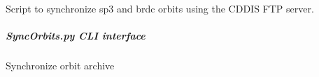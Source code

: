 \documentclass[letterpaper,10pt,english]{sphinxmanual}
\begin{document}
\sphinxAtStartPar
Script to synchronize sp3 and brdc orbits using the CDDIS FTP server.

\begin{fulllineitems}
\label{\detokenize{pgamit.com:pgamit.com.SyncOrbits.main}}
\pysigstartsignatures
\pysiglinewithargsret
{}
{}
{}
\pysigstopsignatures
\end{fulllineitems}



\subparagraph{SyncOrbits.py \sphinxhyphen{} CLI interface}
\label{\detokenize{pgamit.com:SyncOrbits.py---CLI-interface}}
\sphinxAtStartPar
Synchronize orbit archive

\begin{sphinxVerbatim}[commandchars=\\\{\}]
 \PYG{p}{[}\PYG{p}{]} \PYG{p}{[}  \PYG{p}{[} \PYG{p}{]}\PYG{p}{]} \PYG{p}{[} \PYG{p}{]}
\end{sphinxVerbatim}
\end{document}
